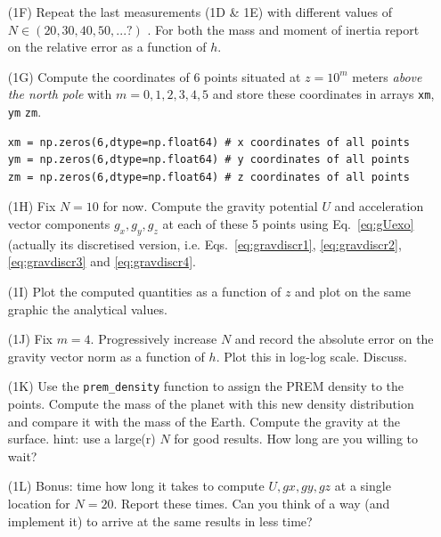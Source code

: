 \begin{itemize}

\item[(1F)] Repeat the last measurements (1D \& 1E) with different values of $N\in(20,30,40,50,...?)$ .
For both the mass and moment of inertia report on the relative error as a function of $h$.

\item[(1G)] Compute the coordinates of 6 points situated at $z=10^m$ meters 
{\it above the north pole} with $m=0,1,2,3,4,5$ and 
store these coordinates in arrays {\tt xm}, {\tt ym} {\tt zm}. 
\begin{lstlisting}
xm = np.zeros(6,dtype=np.float64) # x coordinates of all points
ym = np.zeros(6,dtype=np.float64) # y coordinates of all points
zm = np.zeros(6,dtype=np.float64) # z coordinates of all points
\end{lstlisting}

\item[(1H)] Fix $N=10$ for now. Compute the gravity potential $U$ and acceleration vector 
components $g_x,g_y,g_z$ at each of these 5 points using Eq.~\eqref{eq:gUexo} (actually its 
discretised version, i.e. Eqs.~\eqref{eq:gravdiscr1}, \eqref{eq:gravdiscr2}, 
\eqref{eq:gravdiscr3} and \eqref{eq:gravdiscr4}.
 
\item[(1I)] Plot the computed quantities as a function of $z$ and plot on 
the same graphic the analytical values. 

\item[(1J)] Fix $m=4$. Progressively increase $N$ and record the absolute error on the gravity vector norm 
as a function of $h$. Plot this in log-log scale. Discuss.

\item[(1K)] Use the {\tt prem\_density} function to assign the PREM \cite{dzan81} density to the points. 
Compute the mass of the planet with this 
new density distribution and compare it with the mass of the Earth. Compute the gravity at the surface.
hint: use a large(r) $N$ for good results. How long are you willing to wait? 

\item[(1L)] Bonus: time how long it takes to compute $U,gx,gy,gz$ at a single location for $N=20$. Report these times. 
Can you think of a way (and implement it) to arrive at the same results in less time?  

\end{itemize}

